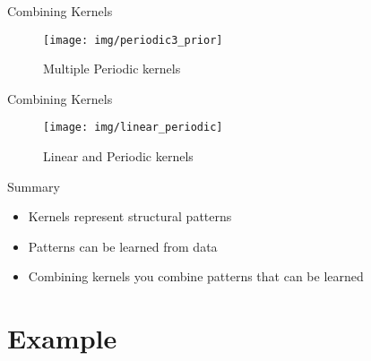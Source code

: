 \documentclass{beamer}
\begin{document}
\begin{frame}{Combining Kernels}
\begin{figure}
    \centering
    \texttt{[image: img/periodic3\_prior]}
    \caption{Multiple Periodic kernels}
\end{figure}
\end{frame}

\begin{frame}{Combining Kernels}
\begin{figure}
    \centering
    \texttt{[image: img/linear\_periodic]}
    \caption{Linear and Periodic kernels}
\end{figure}
\end{frame}

\begin{frame}{Summary}
    \begin{itemize}
        \item Kernels represent structural patterns
        \item Patterns can be learned from data
        \item Combining kernels you combine patterns that can be learned
    \end{itemize}
\end{frame}

\section{Example}
\end{document}
